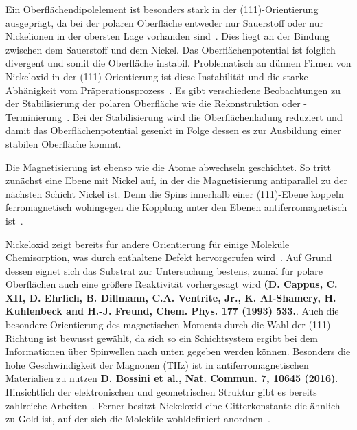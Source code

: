             Ein Oberflächendipolelement ist besonders stark in der (111)-Orientierung ausgeprägt, da bei der polaren Oberfläche entweder nur Sauerstoff oder nur Nickelionen in der obersten Lage vorhanden sind~\cite{NiO_8}.
            Dies liegt an der Bindung zwischen dem Sauerstoff und dem Nickel.
            Das Oberflächenpotential ist folglich divergent und somit die Oberfläche instabil.
            Problematisch an dünnen Filmen von Nickeloxid in der (111)-Orientierung ist diese Instabilität und die starke Abhänigkeit vom Präperationsprozess~\cite{NiO_36}.
            Es gibt verschiedene Beobachtungen zu der Stabilisierung der polaren Oberfläche wie die Rekonstruktion oder -Terminierung~\cite{NiO_36, NiO_35, NiO_34, NiO_27, NiO_10}.
            Bei der Stabilisierung wird die Oberflächenladung reduziert und damit das Oberflächenpotential gesenkt in Folge dessen es zur Ausbildung einer stabilen Oberfläche kommt.

            Die Magnetisierung ist ebenso wie die Atome abwechseln geschichtet.
            So tritt zunächst eine Ebene mit Nickel auf, in der die Magnetisierung antiparallel zu der nächsten Schicht Nickel ist.
            Denn die Spins innerhalb einer (111)-Ebene koppeln ferromagnetisch wohingegen die Kopplung unter den Ebenen antiferromagnetisch ist~\cite{FeO_6}.

            Nickeloxid zeigt bereits für andere Orientierung für einige Moleküle Chemisorption, was durch enthaltene Defekt hervorgerufen wird~\cite{kunz_chemisorption_1985}.
            Auf Grund dessen eignet sich das Substrat zur Untersuchung bestens, zumal für polare Oberflächen auch eine größere Reaktivität vorhergesagt wird \textbf{(D. Cappus, C. XII, D. Ehrlich, B. Dillmann, C.A. Ventrite, Jr., K. AI-Shamery, H. Kuhlenbeck and H.-J. Freund, Chem. Phys. 177 (1993) 533.}.
            Auch die besondere Orientierung des magnetischen Moments durch die Wahl der (111)-Richtung ist bewusst gewählt, da sich so ein Schichtsystem ergibt bei dem Informationen über Spinwellen nach unten gegeben werden können.
            Besonders die hohe Geschwindigkeit der Magnonen (\si{\tera\hertz}) ist in antiferromagnetischen Materialien zu nutzen \textbf{D. Bossini et al., Nat. Commun. 7, 10645 (2016)}.
            Hinsichtlich der elektronischen und geometrischen Struktur gibt es bereits zahlreiche Arbeiten~\cite{NiO_7, NiO_34, NiO_35, NiO_37, NiO_8, NiO_13}.
            Ferner besitzt Nickeloxid eine Gitterkonstante die ähnlich zu Gold ist, auf der sich die Moleküle wohldefiniert anordnen~\cite{5A_1}.

